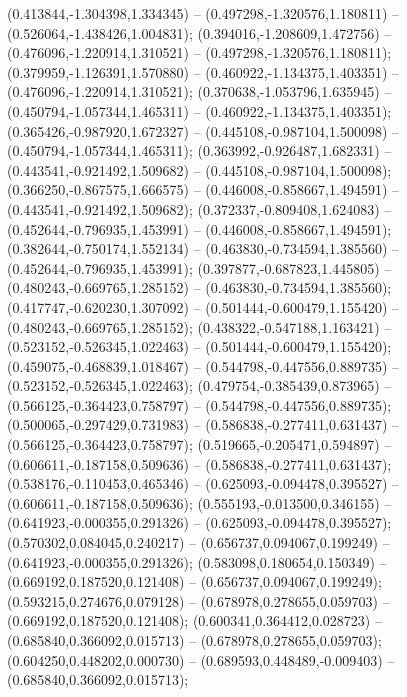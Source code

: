  (0.413844,-1.304398,1.334345) -- (0.497298,-1.320576,1.180811) -- (0.526064,-1.438426,1.004831);
 (0.394016,-1.208609,1.472756) -- (0.476096,-1.220914,1.310521) -- (0.497298,-1.320576,1.180811);
 (0.379959,-1.126391,1.570880) -- (0.460922,-1.134375,1.403351) -- (0.476096,-1.220914,1.310521);
 (0.370638,-1.053796,1.635945) -- (0.450794,-1.057344,1.465311) -- (0.460922,-1.134375,1.403351);
 (0.365426,-0.987920,1.672327) -- (0.445108,-0.987104,1.500098) -- (0.450794,-1.057344,1.465311);
 (0.363992,-0.926487,1.682331) -- (0.443541,-0.921492,1.509682) -- (0.445108,-0.987104,1.500098);
 (0.366250,-0.867575,1.666575) -- (0.446008,-0.858667,1.494591) -- (0.443541,-0.921492,1.509682);
 (0.372337,-0.809408,1.624083) -- (0.452644,-0.796935,1.453991) -- (0.446008,-0.858667,1.494591);
 (0.382644,-0.750174,1.552134) -- (0.463830,-0.734594,1.385560) -- (0.452644,-0.796935,1.453991);
 (0.397877,-0.687823,1.445805) -- (0.480243,-0.669765,1.285152) -- (0.463830,-0.734594,1.385560);
 (0.417747,-0.620230,1.307092) -- (0.501444,-0.600479,1.155420) -- (0.480243,-0.669765,1.285152);
 (0.438322,-0.547188,1.163421) -- (0.523152,-0.526345,1.022463) -- (0.501444,-0.600479,1.155420);
 (0.459075,-0.468839,1.018467) -- (0.544798,-0.447556,0.889735) -- (0.523152,-0.526345,1.022463);
 (0.479754,-0.385439,0.873965) -- (0.566125,-0.364423,0.758797) -- (0.544798,-0.447556,0.889735);
 (0.500065,-0.297429,0.731983) -- (0.586838,-0.277411,0.631437) -- (0.566125,-0.364423,0.758797);
 (0.519665,-0.205471,0.594897) -- (0.606611,-0.187158,0.509636) -- (0.586838,-0.277411,0.631437);
 (0.538176,-0.110453,0.465346) -- (0.625093,-0.094478,0.395527) -- (0.606611,-0.187158,0.509636);
 (0.555193,-0.013500,0.346155) -- (0.641923,-0.000355,0.291326) -- (0.625093,-0.094478,0.395527);
 (0.570302,0.084045,0.240217) -- (0.656737,0.094067,0.199249) -- (0.641923,-0.000355,0.291326);
 (0.583098,0.180654,0.150349) -- (0.669192,0.187520,0.121408) -- (0.656737,0.094067,0.199249);
 (0.593215,0.274676,0.079128) -- (0.678978,0.278655,0.059703) -- (0.669192,0.187520,0.121408);
 (0.600341,0.364412,0.028723) -- (0.685840,0.366092,0.015713) -- (0.678978,0.278655,0.059703);
 (0.604250,0.448202,0.000730) -- (0.689593,0.448489,-0.009403) -- (0.685840,0.366092,0.015713);
